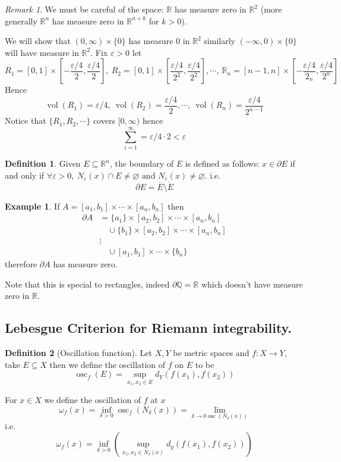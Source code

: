 \documentclass[11pt,openany]{book}
\theoremstyle{plain}
\theoremstyle{definition}
\newtheorem{definition}{Definition}[chapter]
\newtheorem{example}{Example}[chapter]
\theoremstyle{remark}
\newtheorem{remark}{Remark}[chapter]
\newcommand{\R}{\mathbb{R}}
\newcommand{\Q}{\mathbb{Q}}
\newcommand{\set}[1]{\{ #1 \}}
\newcommand{\vol}{\operatorname{vol}}
\begin{document}
\begin{remark}
    We must be careful of the space: $\R$ has measure zero in $\R^2$ (more generally $\R^n$ has measure zero in 
    $\R^{n+k}$ for $k > 0$). 

    We will show that $(0, \infty) \times \set{0}$ has measure $0$ in $\R^2$ similarly $(-\infty, 0) \times \set{0}$ will 
    have measure in $\R^2$. Fix $\varepsilon > 0$ let 
    $$R_1 = [0,1] \times [-\frac{\varepsilon/4}{2}, \frac{\varepsilon/4}{2}], \ R_2 = [0,1] \times [\frac{\varepsilon/4}{2^2}, \frac{\varepsilon/4}{2^2}], \cdots, \ \R_n = [n-1, n] \times [-\frac{\varepsilon/4}{2_n}, \frac{\varepsilon/4}{2^n}]$$
    Hence 
    $$\vol (R_1) = \varepsilon/4, \ \vol (R_2) = \frac{\varepsilon/4}{2}, \cdots, \ \vol (R_n) = \frac{\varepsilon/4}{2^{n-1}}$$
    Notice that $\set{R_1, R_2, \cdots}$ covers $[0, \infty)$ hence 
    $$\sum_{i=1}^\infty = \varepsilon/4 \cdot 2 < \varepsilon$$

\end{remark}

\begin{definition}
    Given $E \subseteq \R^n$, the boundary of $E$ is defined as follows: $x \in \partial E$ if and only if  
    $\forall \varepsilon > 0, \ N_\varepsilon(x) \cap E \ne \varnothing \text{ and } N_\varepsilon(x) \ne \varnothing$. 
    i.e. 
    $$\partial E = \overline{E} \setminus \mathring{E}$$ 
\end{definition}

\begin{example}
    If $A = [a_1, b_1] \times \cdots \times [a_n , b_n]$ then 
    \begin{align*}
        \partial A &= \set{a_1} \times [a_2, b_2] \times \cdots \times [a_n, b_n] \\
        &\quad \cup \set{b_1} \times [a_2, b_2] \times \cdots \times [a_n, b_n] \\
        &\vdots \\
        &\quad \cup [a_1, b_1] \times \cdots \times \set{b_n} 
    \end{align*}
    therefore $\partial A$ has measure zero. 

    Note that this is special to rectangles, indeed $\partial \Q = \R$ which doesn't have measure zero in $\R$.
\end{example}
\subsection{Lebesgue Criterion for Riemann integrability.} 
\begin{definition}[Oscillation function]
    Let $X, Y$ be metric spaces and $f \colon X \to Y$, take $E \subseteq X$ then we define the oscillation of $f$ on $E$ to be 
    $$\operatorname{osc}_f (E) = \sup_{x_1, x_2 \in E} d_Y(f(x_1), f(x_2))$$    

    For $x \in X$ we define the oscillation of $f$ at $x$ 
    $$\omega_f (x) =  \inf_{\delta > 0} \operatorname{osc}_f (N_\delta (x)) = \lim_{\delta \to 0 \operatorname{osc} (N_\delta(x))}$$
    i.e. 
    $$\omega_f (x) = \inf_{\delta > 0} \left(\sup_{x_1, x_2 \in N_\delta(x)} d_y(f(x_1), f(x_2))\right)$$
\end{definition}
\end{document}
